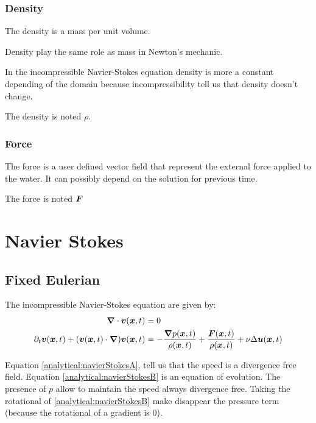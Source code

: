 \subsubsection{Density}

The density is a mass per unit volume.

Density play the same role as mass in Newton's mechanic.

In the incompressible Navier-Stokes equation density is more a constant depending
of the domain because incompressibility tell us that density doesn't change.

The density is noted $\rho$.

\subsubsection{Force}

The force is a user defined vector field that represent the external force applied to the water.
It can possibly depend on the solution for previous time.

The force is noted ${\boldsymbol {F}}$

\section{Navier Stokes}

\subsection{Fixed Eulerian}
\label{analytical:fixe_eulerian}
The incompressible Navier-Stokes equation are given by:
\begin{subequations}
\begin{align}
\label{analytical:navierStokesA}
{\boldsymbol {\nabla}} \cdot {\boldsymbol {v}}({\boldsymbol {x}} ,t)&=0\\
\label{analytical:navierStokesB}
\partial_t {\boldsymbol {v}}({\boldsymbol {x}} ,t)+({\boldsymbol {v}}({\boldsymbol {x}},t)\cdot{\boldsymbol {\nabla}} ) {\boldsymbol {v}}({\boldsymbol {x}} ,t)&=-\frac{{\boldsymbol {\nabla}} p({\boldsymbol {x}},t)}{\rho({\boldsymbol {x}},t)}+\frac{{\boldsymbol {F}}({\boldsymbol {x}},t)}{\rho({\boldsymbol {x}},t)}+\nu \Delta {\boldsymbol {u}}({\boldsymbol {x}},t)
\end{align}
\end{subequations}

Equation \ref{analytical:navierStokesA}, tell us that the speed is a divergence free field.
Equation \ref{analytical:navierStokesB} is an equation of evolution. The presence of $p$ allow to maintain the speed always divergence free.
Taking the rotational of \ref{analytical:navierStokesB} make disappear the pressure term (because the rotational of a gradient is 0).

